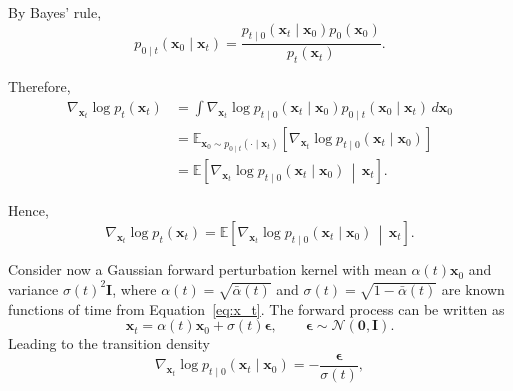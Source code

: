 \begin{compactproof}[title={Proof}]
By Bayes' rule,
\begin{equation*}
p_{0\mid t}(\mathbf{x}_0\mid \mathbf{x}_t)
=
\frac{
p_{t\mid 0}(\mathbf{x}_t\mid \mathbf{x}_0)
p_0(\mathbf{x}_0)
}{
p_t(\mathbf{x}_t)
}.
\end{equation*}

Therefore,
\begin{align*}
\nabla_{\mathbf{x}_t}\log p_t(\mathbf{x}_t)
&=
\int
\nabla_{\mathbf{x}_t}
\log p_{t\mid 0}(\mathbf{x}_t\mid \mathbf{x}_0)
p_{0\mid t}(\mathbf{x}_0\mid \mathbf{x}_t)
\,d\mathbf{x}_0
\\
&=
\mathbb{E}_{\mathbf{x}_0\sim
p_{0\mid t}(\cdot\mid\mathbf{x}_t)}
\left[
\nabla_{\mathbf{x}_t}
\log p_{t\mid 0}(\mathbf{x}_t\mid \mathbf{x}_0)
\right]
\\
&=
\mathbb{E}
\left[
\nabla_{\mathbf{x}_t}
\log p_{t\mid 0}(\mathbf{x}_t\mid \mathbf{x}_0)
\,\middle|\,
\mathbf{x}_t
\right].
\end{align*}

Hence,
\begin{equation*}
\boxed{
\nabla_{\mathbf{x}_t}\log p_t(\mathbf{x}_t)
=
\mathbb{E}
\left[
\nabla_{\mathbf{x}_t}
\log p_{t\mid 0}(\mathbf{x}_t\mid \mathbf{x}_0)
\,\middle|\,
\mathbf{x}_t
\right].
}
\end{equation*}
\end{compactproof}




Consider now a Gaussian forward perturbation kernel with mean $\alpha(t)\mathbf{x}_0$ and variance $\sigma(t)^2\mathbf{I}$, where $\alpha(t)=\sqrt{\bar{\alpha}(t)}$ and $\sigma(t)=\sqrt{1-\bar{\alpha}(t)}$ are known functions of time from Equation~\eqref{eq:x_t}. The forward process can be written as
\begin{equation*}
\mathbf{x}_t
=
\alpha(t)\mathbf{x}_0
+
\sigma(t)\boldsymbol{\epsilon},
\qquad
\boldsymbol{\epsilon}\sim\mathcal{N}(\mathbf{0},\mathbf{I}).
\end{equation*}
Leading to the transition density
\begin{equation}
    \nabla_{\mathbf{x}_t}
    \log p_{t\mid 0}(\mathbf{x}_t\mid\mathbf{x}_0)
    =
    -\frac{\boldsymbol{\epsilon}}{\sigma(t)},
\end{equation}


